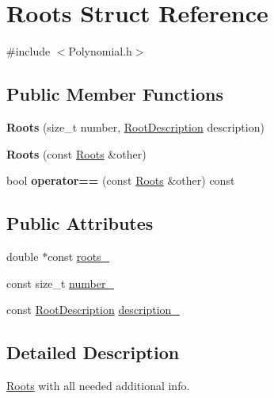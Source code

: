 \hypertarget{struct_roots}{}\section{Roots Struct Reference}
\label{struct_roots}


{\ttfamily \#include $<$Polynomial.\+h$>$}

\subsection*{Public Member Functions}
\begin{DoxyCompactItemize}
\item 
\mbox{\label{struct_roots_a42aacf1f673d1f2e8921d8e863662156}} 
{\bfseries Roots} (size\+\_\+t number, \mbox{\hyperlink{_polynomial_8h_a4d41a8f81d16e61db1ddcce54a5f2586}{Root\+Description}} description)
\item 
\mbox{\label{struct_roots_a48a84c78efd399069d70ef6ef1ccd9b9}} 
{\bfseries Roots} (const \mbox{\hyperlink{struct_roots}{Roots}} \&other)
\item 
\mbox{\label{struct_roots_a70ef01b7a2f2abeb3cca93ea5f60a568}} 
bool {\bfseries operator==} (const \mbox{\hyperlink{struct_roots}{Roots}} \&other) const
\end{DoxyCompactItemize}
\subsection*{Public Attributes}
\begin{DoxyCompactItemize}
\item 
double $\ast$const \mbox{\hyperlink{struct_roots_a00965d33c485ae90b7a39897f5d294ca}{roots\+\_\+}}
\item 
const size\+\_\+t \mbox{\hyperlink{struct_roots_ad9095b5cdb111b3aa65f3c8a6b2e7ffa}{number\+\_\+}}
\item 
const \mbox{\hyperlink{_polynomial_8h_a4d41a8f81d16e61db1ddcce54a5f2586}{Root\+Description}} \mbox{\hyperlink{struct_roots_ac5b01dd8b179332c71dfb2dce785fae0}{description\+\_\+}}
\end{DoxyCompactItemize}


\subsection{Detailed Description}
\mbox{\hyperlink{struct_roots}{Roots}} with all needed additional info. 

